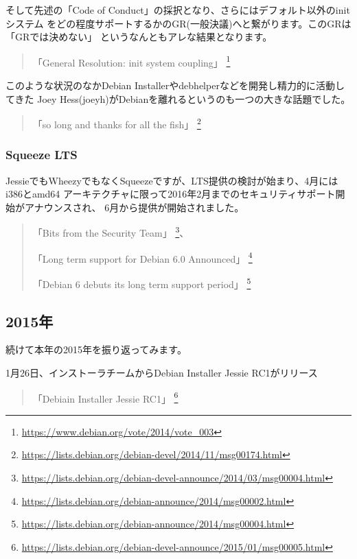 \documentclass[mingoth,a4paper]{jsarticle}
\begin{document}
そして先述の「Code of Conduct」の採択となり、さらにはデフォルト以外のinitシステム
をどの程度サポートするかのGR(一般決議)へと繋がります。このGRは「GRでは決めない」
というなんともアレな結果となります。

\begin{quote}
  「General Resolution: init system coupling」
  \footnote{\url{https://www.debian.org/vote/2014/vote_003}}
\end{quote}

このような状況のなかDebian Installerやdebhelperなどを開発し精力的に活動してきた
Joey Hess(joeyh)がDebianを離れるというのも一つの大きな話題でした。

\begin{quote}
  「so long and thanks for all the fish」
  \footnote{\url{https://lists.debian.org/debian-devel/2014/11/msg00174.html}}
\end{quote}


\subsubsection{Squeeze LTS}

JessieでもWheezyでもなくSqueezeですが、LTS提供の検討が始まり、4月にはi386とamd64
アーキテクチャに限って2016年2月までのセキュリティサポート開始がアナウンスされ、
6月から提供が開始されました。

\begin{quote}
  「Bits from the Security Team」
  \footnote{\url{https://lists.debian.org/debian-devel-announce/2014/03/msg00004.html}}、

  「Long term support for Debian 6.0 Announced」
  \footnote{\url{https://lists.debian.org/debian-announce/2014/msg00002.html}}

  「Debian 6 debuts its long term support period」
  \footnote{\url{https://lists.debian.org/debian-announce/2014/msg00004.html}}
\end{quote}


\subsection{2015年}

続けて本年の2015年を振り返ってみます。

1月26日、インストーラチームからDebian Installer Jessie RC1がリリース
\begin{quote}
  「Debiain Installer Jessie RC1」
  \footnote{\url{https://lists.debian.org/debian-devel-announce/2015/01/msg00005.html}}
\end{quote}
\end{document}
